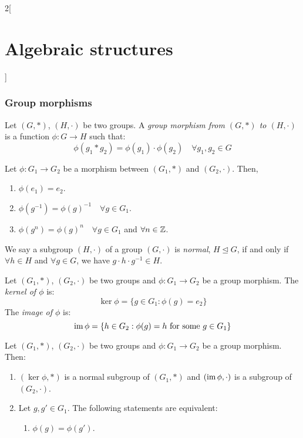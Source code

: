 \documentclass[../../../main.tex]{subfiles}
\begin{document}
\begin{multicols}{2}[\section{Algebraic structures}]
    \subsubsection{Group morphisms}
    \begin{definition}\label{AS_groupmorphism}
        Let $(G,*)$, $(H,\cdot)$ be two groups. A \textit{group morphism from $(G,*)$ to $(H,\cdot)$} is a function $\phi:G\rightarrow H$ such that: $$\phi(g_1*g_2)=\phi(g_1)\cdot\phi(g_2)\quad\forall g_1,g_2\in G$$
    \end{definition}
    \begin{lemma}
        Let $\phi:G_1\rightarrow G_2$ be a morphism between $(G_1,*)$ and $(G_2,\cdot)$. Then,
        \begin{enumerate}
            \item $\phi(e_1)=e_2$.
            \item $\phi(g^{-1})=\phi(g)^{-1}\quad\forall g\in G_1$.
            \item $\phi(g^n)=\phi(g)^n\quad\forall g\in G_1$ and $\forall n\in\mathbb{Z} $.
        \end{enumerate}
    \end{lemma}
    \begin{definition}
        We say a subgroup $(H,\cdot)$ of a group $(G,\cdot)$ is \textit{normal}, $H\unlhd G$, if and only if $\forall h\in H$ and $\forall g\in G$, we have $g\cdot h\cdot g^{-1}\in H$.
    \end{definition}
    \begin{definition}
        Let $(G_1,*)$, $(G_2,\cdot)$ be two groups and $\phi:G_1\rightarrow G_2$ be a group morphism. The \textit{kernel of $\phi$} is: $$\ker\phi=\{g\in G_1:\phi(g)=e_2\}$$
        The \textit{image of $\phi$} is: $$\operatorname{im}\phi=\{h\in G_2:\phi(g)=h\text{ for some }g\in G_1\}$$
    \end{definition}
    \begin{prop}
        Let $(G_1,*)$, $(G_2,\cdot)$ be two groups and $\phi:G_1\rightarrow G_2$ be a group morphism. Then:
        \begin{enumerate}
            \item $(\ker\phi,*)$ is a normal subgroup of $(G_1,*)$ and $(\operatorname{im}\phi,\cdot)$ is a subgroup of $(G_2,\cdot)$.
            \item Let $g,g'\in G_1$. The following statements are equivalent:
                  \begin{enumerate}
                      \item $\phi(g)=\phi(g')$.

\end{enumerate}
\end{enumerate}
\end{prop}
\end{multicols}
\end{document}
